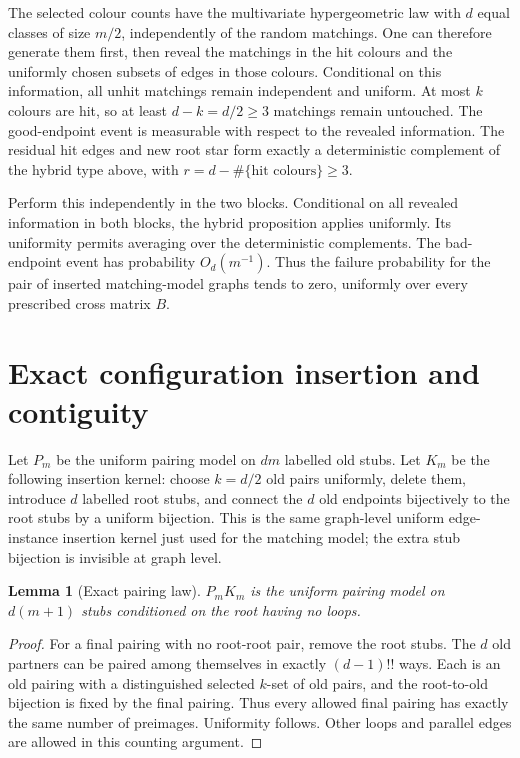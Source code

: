 \documentclass[11pt]{article}
\newtheorem{lemma}{Lemma}
\begin{document}
The selected colour counts have the multivariate hypergeometric law
with $d$ equal classes of size $m/2$, independently of the random
matchings. One can therefore generate them first, then reveal the
matchings in the hit colours and the uniformly chosen subsets of
edges in those colours. Conditional on this information, all unhit
matchings remain independent and uniform. At most $k$ colours are
hit, so at least $d-k=d/2\ge3$ matchings remain untouched.
The good-endpoint event is measurable with respect to the revealed
information. The residual hit edges and new root star form exactly a
deterministic complement of the hybrid type above, with
$r=d-\#\{\text{hit colours}\}\ge3$.

Perform this independently in the two blocks. Conditional on all
revealed information in both blocks, the hybrid proposition applies
uniformly. Its uniformity permits averaging over the deterministic
complements. The bad-endpoint event has probability $O_d(m^{-1})$.
Thus the failure probability for the pair of inserted matching-model
graphs tends to zero, uniformly over every prescribed cross matrix $B$.

\section{Exact configuration insertion and contiguity}
Let $P_m$ be the uniform pairing model on $dm$ labelled old stubs. Let
$K_m$ be the following insertion kernel: choose $k=d/2$ old pairs
uniformly, delete them, introduce $d$ labelled root stubs, and connect
the $d$ old endpoints bijectively to the root stubs by a uniform
bijection. This is the same graph-level uniform edge-instance insertion
kernel just used for the matching model; the extra stub bijection is
invisible at graph level.

\begin{lemma}[Exact pairing law]\label{lem:pairing}
$P_mK_m$ is the uniform pairing model on $d(m+1)$ stubs conditioned on
the root having no loops.
\end{lemma}
\begin{proof}
For a final pairing with no root-root pair, remove the root stubs.
The $d$ old partners can be paired among themselves in exactly
$(d-1)!!$ ways. Each is an old pairing with a distinguished selected
$k$-set of old pairs, and the root-to-old bijection is fixed by the
final pairing. Thus every allowed final pairing has exactly the same
number of preimages. Uniformity follows. Other loops and parallel
edges are allowed in this counting argument.
\end{proof}
\end{document}
